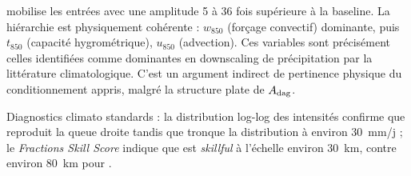 \Oracle{} mobilise les entrées avec une amplitude 5 à 36 fois supérieure à la baseline. La hiérarchie est physiquement cohérente : $w_{850}$ (forçage convectif) dominante, puis $t_{850}$ (capacité hygrométrique), $u_{850}$ (advection). Ces variables sont précisément celles identifiées comme dominantes en downscaling de précipitation par la littérature climatologique. C'est un argument indirect de pertinence physique du conditionnement appris, malgré la structure plate de $A_{\mathrm{dag}}$.

\label{ssec:exp-annexe-climato}

Diagnostics climato standards : la distribution log-log des intensités confirme que \Oracle{} reproduit la queue droite tandis que \CorrDiff{} tronque la distribution à environ $30$~mm/j ; le \emph{Fractions Skill Score} indique que \Oracle{} est \emph{skillful} à l'échelle environ $30$~km, contre environ $80$~km pour \CorrDiff{}.

\myRestoreMarks
